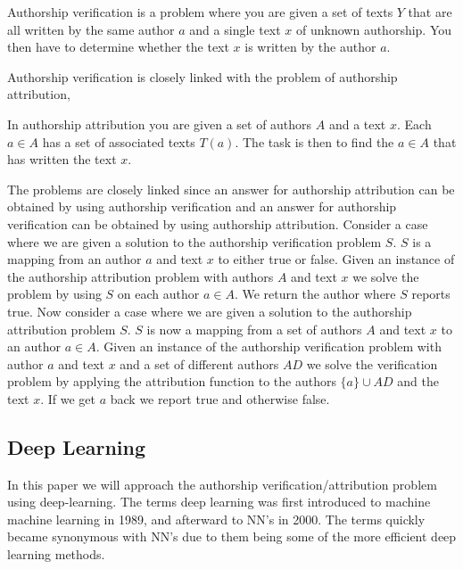 \begin{definition}

    Authorship verification is a problem where you are given a set of texts $Y$
    that are all written by the same author $a$ and a single text $x$ of unknown
    authorship. You then have to determine whether the text $x$ is written by
    the author $a$.

\end{definition}

Authorship verification is closely linked with the problem of authorship
attribution,

\begin{definition}

    In authorship attribution you are given a set of authors $A$ and a text $x$.
    Each $a \in A$ has a set of associated texts $T(a)$. The task is then to
    find the $a \in A$ that has written the text $x$.

\end{definition}

The problems are closely linked since an answer for authorship attribution can
be obtained by using authorship verification and an answer for authorship
verification can be obtained by using authorship attribution. Consider a case
where we are given a solution to the authorship verification problem $S$. $S$ is
a mapping from an author $a$ and text $x$ to either true or false. Given an
instance of the authorship attribution problem with authors $A$ and text $x$ we
solve the problem by using $S$ on each author $a \in A$. We return the author
where $S$ reports true. Now consider a case where we are given a solution to the
authorship attribution problem $S$. $S$ is now a mapping from a set of authors
$A$ and text $x$ to an author $a \in A$. Given an instance of the authorship
verification problem with author $a$ and text $x$ and a set of different authors
$AD$ we solve the verification problem by applying the attribution function to
the authors $\{a\} \cup AD$ and the text $x$. If we get $a$ back we report
true and otherwise false.

\subsection{Deep Learning}

In this paper we will approach the authorship verification/attribution problem
using deep-learning. The terms deep learning was first introduced to machine
machine learning in 1989, and afterward to \gls{NN}'s in 2000. The terms quickly
became synonymous with \gls{NN}'s due to them being some of the more efficient
deep learning methods.\cite{Schmidhuber:2015} 

